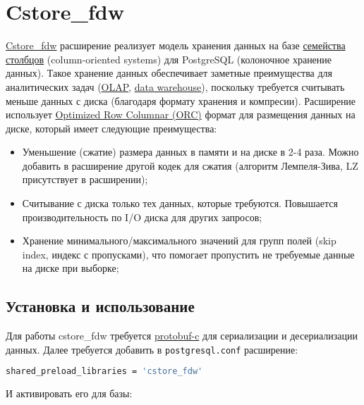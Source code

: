 \section{Cstore\_fdw}

\href{https://citusdata.github.io/cstore\_fdw/}{Cstore\_fdw} расширение реализует модель хранения данных на базе \href{https://en.wikipedia.org/wiki/Column-oriented\_DBMS}{семейства столбцов} (column-oriented systems) для PostgreSQL (колоночное хранение данных). Такое хранение данных обеспечивает заметные преимущества для аналитических задач (\href{https://ru.wikipedia.org/wiki/OLAP}{OLAP}, \href{https://en.wikipedia.org/wiki/Data\_warehouse}{data warehouse}), поскольку требуется считывать меньше данных с диска (благодаря формату хранения и компресии). Расширение использует \href{https://cwiki.apache.org/confluence/display/Hive/LanguageManual+ORC#LanguageManualORC-ORCFileFormat}{Optimized Row Columnar (ORC)} формат для размещения данных на диске, который имеет следующие преимущества:

\begin{itemize}
  \item Уменьшение (сжатие) размера данных в памяти и на диске в 2-4 раза. Можно добавить в расширение другой кодек для сжатия (алгоритм Лемпеля-Зива, LZ присутствует в расширении);
  \item Считывание с диска только тех данных, которые требуются. Повышается производительность по I/O диска для других запросов;
  \item Хранение минимального/максимального значений для групп полей (skip index, индекс с пропусками), что помогает пропустить не требуемые данные на диске при выборке;
\end{itemize}


\subsection{Установка и использование}

Для работы cstore\_fdw требуется \href{https://github.com/protobuf-c/protobuf-c}{protobuf-c} для сериализации и десериализации данных. Далее требуется добавить в \lstinline!postgresql.conf! расширение:

\begin{lstlisting}[language=Bash,label=lst:cstore1,caption=Cstore\_fdw]
shared_preload_libraries = 'cstore_fdw'
\end{lstlisting}

И активировать его для базы:

